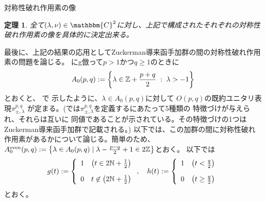 \documentclass[notes,notheorems]{beamer}
\newcommand{\nin}{\not\in}
\newtheorem{theorem}{定理}
\theoremstyle{definition}
\theoremstyle{example}
\theoremstyle{remark}
\theoremstyle{mystyle}
\begin{document}
\begin{frame}{対称性破れ作用素の像}
	\begin{theorem}
		全て$(\lambda, \nu) \in \mathbbm{C}^2$に対し、上記で構成されたそれぞれの対称性破れ作用素の像を具体的に決定出来る。
	\end{theorem}
\end{frame}
\begin{frame}{}
	最後に、上記の結果の応用としてZuckerman導来函手加群の間の対称性破れ作用素の問題を論じる。
\cite[(5.1.1)]{KO2}にg{倣}って$p>1${かつ}$q\ge1$のときに\begin{equation*}
	A_0(p,q):=\left\{ \lambda\in\mathbb{Z}+\frac{p+q}{2}\;:\;\lambda>-1 \right\}
\end{equation*}とおくと、
\cite{KO2}で
示したように、$\lambda\in A_0(p,q)$に対して
$O(p,q)$の既約ユニタリ表現$\pi_{\pm,\lambda}^{p,q}$
が定まる。(\cite{KO2}では$\pi_{\pm,\lambda}^{p,q}$を定義するにあたって5種類の
特徴づけが与えら{れ}、それらは互いに
同値であることが示されている。その特徴づけの1つは
Zuckerman導来函手加群で記載される。)
以下では、この加群の間に対称性破れ作用素がある{か}について論じる。簡単のため、$A_0^{\mbox{\scriptsize even}}(p,q):=\left\{ \lambda\in A_0(p,q)\mid \lambda-\frac{p-q}{2}+1\in2\mathbb{Z} \right\}$とおく。
以下では\begin{equation*}
	g(t):=\left\{ \begin{array}[]{ll}
		1&\left(t\in2\N+\frac{1}{2}  \right)\\[10pt]
		0&t\nin \left(2\N+\frac{1}{2}  \right)
	\end{array}\right.,\quad h(t):=\left\{ \begin{array}[]{ll}
		1&\left(  t<\frac{q}{2}\right)
		\\[10pt]
		0&\left( t\ge\frac{q}{2} \right)
\end{array}\right.
\end{equation*}とおく。
\end{frame}
\end{document}
